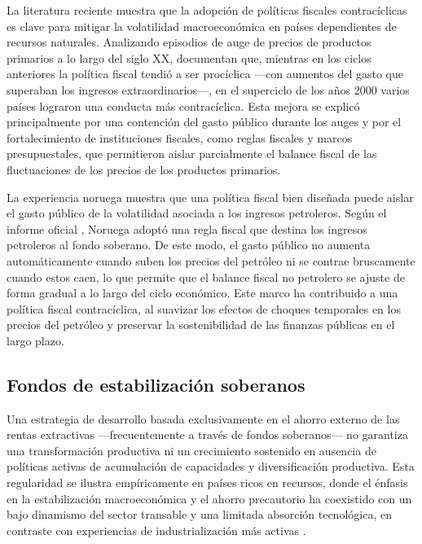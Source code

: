 \documentclass[../../TFM.tex]{subfiles}
\begin{document}
	La literatura reciente muestra que la adopción de políticas fiscales contracíclicas es clave para mitigar la volatilidad macroeconómica en países dependientes de recursos naturales. Analizando episodios de auge de precios de productos primarios a lo largo del siglo XX, \textcite{Cspedes2014} documentan que, mientras en los ciclos anteriores la política fiscal tendió a ser procíclica —con aumentos del gasto que superaban los ingresos extraordinarios—, en el superciclo de los años 2000 varios países lograron una conducta más contracíclica. Esta mejora se explicó principalmente por una contención del gasto público durante los auges y por el fortalecimiento de instituciones fiscales, como reglas fiscales y marcos presupuestales, que permitieron aislar parcialmente el balance fiscal de las fluctuaciones de los precios de los productos primarios.
	
	La experiencia noruega muestra que una política fiscal bien diseñada puede aislar el gasto público de la volatilidad asociada a los ingresos petroleros. Según el informe oficial \textcite{NOU2015}, Noruega adoptó una regla fiscal que destina los ingresos petroleros al fondo soberano. De este modo, el gasto público no aumenta automáticamente cuando suben los precios del petróleo ni se contrae bruscamente cuando estos caen, lo que permite que el balance fiscal no petrolero se ajuste de forma gradual a lo largo del ciclo económico. Este marco ha contribuido a una política fiscal contracíclica, al suavizar los efectos de choques temporales en los precios del petróleo y preservar la sostenibilidad de las finanzas públicas en el largo plazo.
	
	\subsection{Fondos de estabilización soberanos}
	\label{subsec:fondos-soberanos}
	
	Una estrategia de desarrollo basada exclusivamente en el ahorro externo de las rentas extractivas —frecuentemente a través de fondos soberanos— no garantiza una transformación productiva ni un crecimiento sostenido en ausencia de políticas activas de acumulación de capacidades y diversificación productiva. Esta regularidad se ilustra empíricamente en países ricos en recursos, donde el énfasis en la estabilización macroeconómica y el ahorro precautorio ha coexistido con un bajo dinamismo del sector transable y una limitada absorción tecnológica, en contraste con experiencias de industrialización más activas \parencite{Cherif2013}.
	
\end{document}
